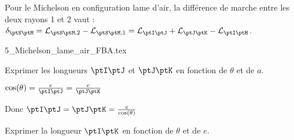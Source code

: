 Pour le Michelson en configuration lame d'air, la différence de marche entre les deux rayons 1 et 2 vaut : $\delta_{\ptS \ptM}=\mathcal{L}_{\ptS \ptM,2}-\mathcal{L}_{\ptS \ptM,1}=\mathcal{L}_{\ptI \ptJ}+\mathcal{L}_{\ptJ \ptK}-\mathcal{L}_{\ptI \ptH}$.
                                \initialisationPartieDroite %
\begin{center}
	{5_Michelson_lame_air_FBA.tex}
\end{center}
                               \finalisationDuPartageDePage %




\debutEntrainement



\begin{enonce}
Exprimer les longueurs $\ptI \ptJ$ et $\ptJ \ptK$ en fonction de $\theta$ et de $a$.
\end{enonce}


\begin{corrige}
	$\cos(\theta)=\frac{e}{\ptI \ptJ}=\frac{e}{\ptJ \ptK}$

	Donc $\ptI \ptJ = \ptJ \ptK = \frac{e}{\cos(\theta)}$
\end{corrige}




\begin{enonce}
Exprimer la longueur $\ptI \ptK$ en fonction de $\theta$ et de $e$.
\end{enonce}

